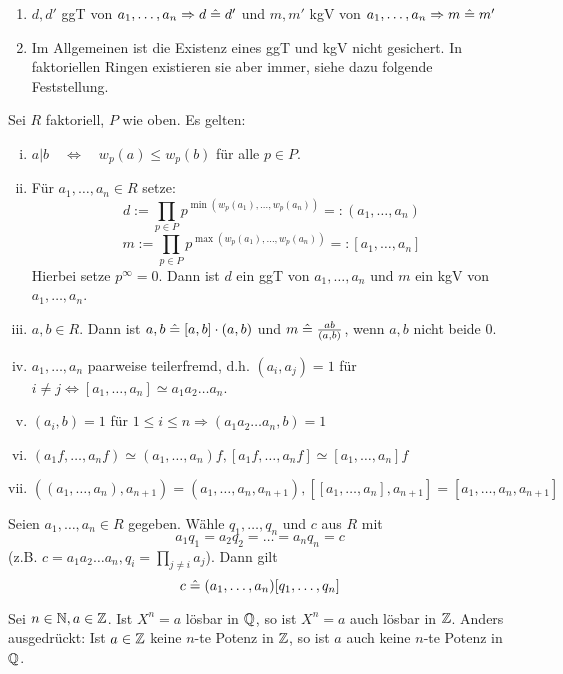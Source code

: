 \newpage
{}
	\begin{enumerate}[1)]
		\item $d, d'$ ggT von $a_1, \dots, a_n \Rightarrow d \mathrel{\hat=} d'$ und $m, m'$ kgV von $a_1, \dots, a_n \Rightarrow m \mathrel{\hat=} m'$
		\item Im Allgemeinen ist die Existenz eines ggT und kgV nicht gesichert. In faktoriellen Ringen existieren sie aber immer, siehe dazu folgende Feststellung.
	\end{enumerate}
	
\begin{falko} \label{F1.8}
	Sei $R$ faktoriell, $P$ wie oben. Es gelten: 
	\begin{enumerate}[(i)]
		\item $a | b \quad \Leftrightarrow \quad w_p(a) \leq w_p(b)$ für alle $p \in P$.
		\item Für $a_1, \dots, a_n \in R$ setze:
		\[d := \prod\limits_{p \in P} p^{\min(w_p(a_1),\dots,w_p(a_n))} =: (a_1,\dots,a_n) \]
		\[m := \prod\limits_{p \in P} p^{\max(w_p(a_1),\dots,w_p(a_n))} =: [a_1,\dots,a_n] \]
		Hierbei setze $p^\infty = 0$. Dann ist $d$ ein ggT von $a_1,\dots,a_n$ und $m$ ein kgV von $a_1,\dots,a_n$.
		\item $a,b \in R$. Dann ist $a,b \mathrel{\hat=} [a,b] \cdot (a,b)$ und $m \mathrel{\hat=} \frac{ab}{(a,b)}$, wenn $a,b$ nicht beide 0.
		\item $a_1,\dots,a_n$ paarweise teilerfremd, d.h. $(a_i,a_j) = 1$ für $i \neq j \Leftrightarrow [a_1,\dots,a_n] \simeq a_1a_2\dots a_n$.
		\item $(a_i,b)=1$ für $1 \leq i \leq n \Rightarrow (a_1a_2\dots a_n,b) = 1$
		\item $(a_1f,\dots,a_nf) \simeq (a_1,\dots,a_n)f, [a_1f,\dots,a_nf] \simeq [a_1,\dots,a_n]f$
		\item $((a_1,\dots,a_n),a_{n+1}) = (a_1,\dots,a_n,a_{n+1}), [[a_1,\dots,a_n],a_{n+1}] = [a_1,\dots,a_n,a_{n+1}]$
	\end{enumerate}
\end{falko}

	Seien $a_1,\dots,a_n \in R$ gegeben. Wähle $q_1,\dots,q_n$ und $c$ aus $R$ mit
	\[ a_1q_1 = a_2q_2 = \dots = a_n q_n = c \]
	(z.B. $c= a_1a_2 \dots a_n, q_i = \prod\limits_{j \neq i} a_j$). Dann gilt
	\[ c \mathrel{\hat=} (a_1,\dots,a_n)[q_1,\dots,q_n] \]
	
\begin{falko} \label{F1.9}
	Sei $n \in \mathbb{N}, a \in \mathbb{Z}$. Ist $X^n = a$ lösbar in $\mathbb{Q}$, so ist $X^n = a$ auch lösbar in $\mathbb{Z}$. Anders ausgedrückt: Ist $a \in \mathbb{Z}$ keine $n$-te Potenz in $\mathbb{Z}$, so ist $a$ auch keine $n$-te Potenz in $\mathbb{Q}$.
\end{falko}

